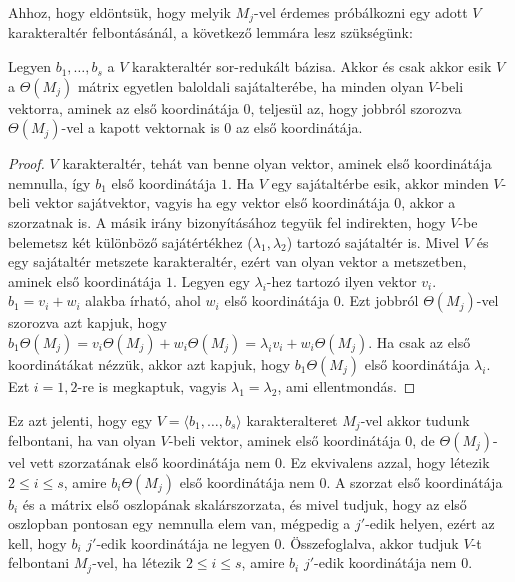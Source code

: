 Ahhoz, hogy eldöntsük, hogy melyik $M_j$-vel érdemes próbálkozni egy adott $V$ karakteraltér felbontásánál, a következő lemmára lesz szükségünk:
\begin{lemma}
\label{thm:bdsmjfix}
Legyen $b_1,\dots,b_s$ a $V$ karakteraltér sor-redukált bázisa.
Akkor és csak akkor esik $V$ a $\Theta(M_j)$ mátrix egyetlen baloldali sajátalterébe, ha minden olyan $V$-beli vektorra, aminek az első koordinátája $0$, teljesül az,
hogy jobbról szorozva $\Theta(M_j)$-vel a kapott vektornak is $0$ az első koordinátája.
\end{lemma}
\begin{proof}
$V$ karakteraltér, tehát van benne olyan vektor, aminek első koordinátája nemnulla, így $b_1$ első koordinátája $1$.
Ha $V$ egy sajátaltérbe esik, akkor minden $V$-beli vektor sajátvektor, vagyis ha egy vektor első koordinátája $0$, akkor a szorzatnak is.
A másik irány bizonyításához tegyük fel indirekten, hogy $V$-be belemetsz két különböző sajátértékhez ($\lambda_1, \lambda_2$) tartozó sajátaltér is.
Mivel $V$ és egy sajátaltér metszete karakteraltér, ezért van olyan vektor a metszetben, aminek első koordinátája $1$. Legyen egy $\lambda_i$-hez tartozó ilyen vektor $v_i$.
$b_1=v_i+w_i$ alakba írható, ahol $w_i$ első koordinátája $0$. Ezt jobbról $\Theta(M_j)$-vel szorozva azt kapjuk, hogy
$b_1\Theta(M_j)=v_i\Theta(M_j)+w_i\Theta(M_j)=\lambda_i v_i+w_i\Theta(M_j)$. Ha csak az első koordinátákat nézzük, akkor azt kapjuk, hogy $b_1\Theta(M_j)$ első koordinátája $\lambda_i$.
Ezt $i=1,2$-re is megkaptuk, vagyis $\lambda_1=\lambda_2$, ami ellentmondás.
\end{proof}
Ez azt jelenti, hogy egy $V=\langle b_1, \dots, b_s \rangle$ karakteralteret $M_j$-vel akkor tudunk felbontani, ha van olyan $V$-beli vektor,
aminek első koordinátája $0$, de $\Theta(M_j)$-vel vett szorzatának első koordinátája nem $0$.
Ez ekvivalens azzal, hogy létezik $2\le i\le s$, amire $b_i \Theta(M_j)$ első koordinátája nem $0$.
A szorzat első koordinátája $b_i$ és a mátrix első oszlopának skalárszorzata, és mivel tudjuk, hogy az első oszlopban pontosan egy nemnulla elem van, mégpedig a $j'$-edik helyen,
ezért az kell, hogy $b_i$ $j'$-edik koordinátája ne legyen $0$.
Összefoglalva, akkor tudjuk $V$-t felbontani $M_j$-vel, ha létezik $2\le i\le s$, amire $b_i$ $j'$-edik koordinátája nem $0$.

